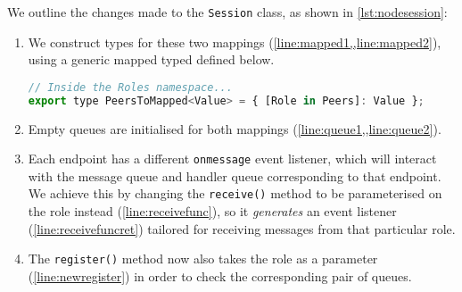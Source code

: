 We outline the changes made to the \texttt{Session} class,
as shown in \cref{lst:nodesession}:

\begin{enumerate}
\item We construct types for these two mappings 
(\cref{line:mapped1,,line:mapped2}), 
using a generic mapped typed defined below.
\begin{lstlisting}[language=javascript]
// Inside the Roles namespace...
export type PeersToMapped<Value> = { [Role in Peers]: Value };
\end{lstlisting}

\item Empty queues are initialised for both mappings
(\cref{line:queue1,,line:queue2}).

\item Each endpoint has a different \texttt{onmessage}
event listener, which will interact with the message queue
and handler queue corresponding to that endpoint. 
We achieve this by changing the \texttt{receive()} method
to be parameterised on the role instead 
(\cref{line:receivefunc}),
so it \textit{generates} an event listener 
(\cref{line:receivefuncret})
tailored for receiving messages
from that particular role.

\item
The \texttt{register()} method now also takes the role
as a parameter (\cref{line:newregister}) in order to check the 
corresponding pair of queues.
\end{enumerate}

